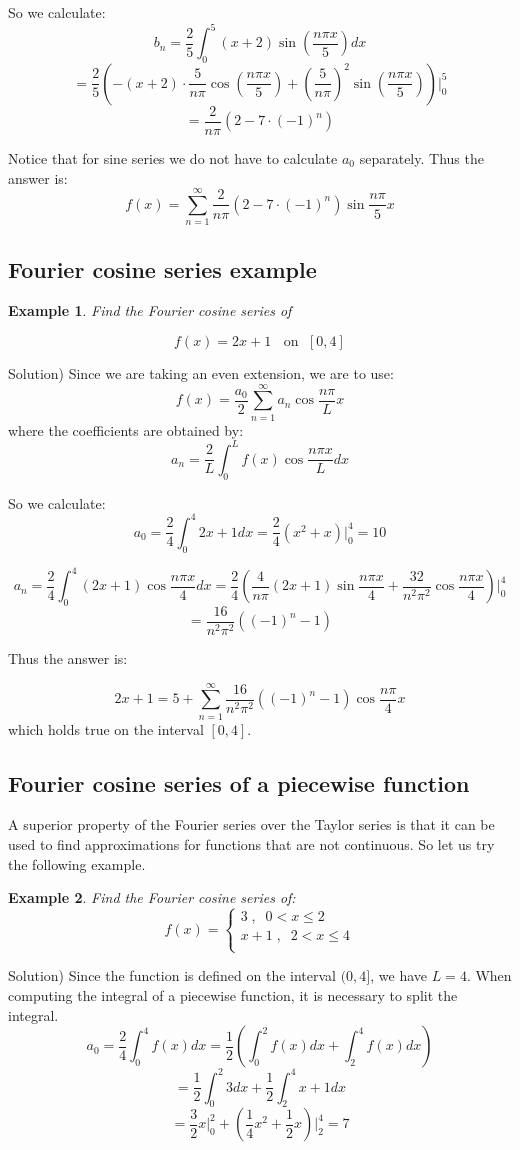 \documentclass[12pt]{report}
\newtheorem{ex}{Example}[section]
\begin{document}
So we calculate:
$$b_n = \frac{2}{5} \int_0^5 (x+2) \sin \left(\frac{n\pi x}{5} \right) dx $$
$$ = \frac{2}{5} \left(-(x+2)\cdot \frac{5}{n\pi} \cos \left(\frac{n\pi x}{5} \right) + \left(\frac{5}{n\pi} \right)^2 \sin \left(\frac{n\pi x}{5} \right) \right) \Bigg\vert_0^5$$
$$ = \frac{2}{n\pi} \left( 2 -7\cdot (-1)^n  \right)$$

Notice that for sine series we do not have to calculate $a_0$ separately. Thus the answer is:
$$f(x) = \sum_{n=1}^{\infty}  \frac{2}{n\pi} \left( 2 -7\cdot (-1)^n  \right) \sin \frac{n\pi}{5} x $$

\subsection*{Fourier cosine series example }

\begin{ex}
	Find the Fourier cosine series of
\end{ex}
$$f(x) = 2x+1 \; \; \textrm{ on } \; [0,4]$$

Solution)
Since we are taking an even extension, we are to use:
$$f(x) = \frac{a_0}{2} \sum_{n=1}^{\infty}  a_n \cos \frac{n\pi}{L} x  $$
where the coefficients are obtained by:
$$a_n = \frac{2}{L} \int_{0}^{L} f(x) \cos \frac{n\pi x}{L}  dx$$

So we calculate:
$$a_0 =  \frac{2}{4} \int_{0}^{4} 2x+1 dx = \frac{2}{4} (x^2+x)\Big|_0^4 = 10$$

$$a_n = \frac{2}{4} \int_{0}^{4} (2x+1) \cos \frac{n\pi x}{4}  dx = \frac{2}{4} \left( \frac{4}{n\pi} (2x+1) \sin \frac{n\pi x}{4} + \frac{32}{n^2\pi^2} \cos \frac{n\pi x}{4} \right) \Big\vert_0^4 $$
$$ = \frac{16}{n^2\pi^2} \left( (-1)^n -1 \right) $$

Thus the answer is:

$$2x+1 = 5+ \sum_{n=1}^{\infty}  \frac{16}{n^2\pi^2} \left( (-1)^n -1 \right) \cos \frac{n\pi}{4} x  $$
which holds true on the interval $[0,4]$.

\subsection*{Fourier cosine series of a piecewise function }
A superior property of the Fourier series over the Taylor series is that it can be used to find approximations for functions that are not continuous. So let us try the following example.

\begin{ex} Find the Fourier cosine series of:
$$ f(x) = \begin{cases} 3 \; , \; \; 0 < x \leq 2 \\ x+1  \; , \; \;  2< x \leq 4 \\ \end{cases} $$
\end{ex}
Solution)
Since the function is defined on the interval $(0,4]$, we have $L=4$.
When computing the integral of a piecewise function, it is necessary to split the integral.
$$a_0 = \frac{2}{4} \int_0^4 f(x) dx = \frac{1}{2} \left( \int_0^2 f(x) dx + \int_2^4 f(x) dx \right)$$
$$ = \frac{1}{2} \int_0^2 3 dx +\frac{1}{2} \int_2^4 x+1 dx $$
$$ = \frac{3}{2}x \Bigg\vert_0^2 +  \left(\frac{1}{4} x^2 + \frac{1}{2} x \right)\Bigg\vert_2^4 = 7$$
\end{document}
